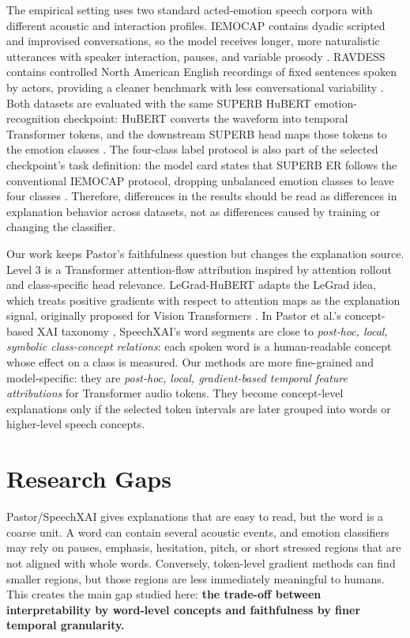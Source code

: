 \documentclass[10pt]{article}
\begin{document}
The empirical setting uses two standard acted-emotion speech corpora with different acoustic and interaction profiles. IEMOCAP contains dyadic scripted and improvised conversations, so the model receives longer, more naturalistic utterances with speaker interaction, pauses, and variable prosody \cite{busso2008iemocap}. RAVDESS contains controlled North American English recordings of fixed sentences spoken by actors, providing a cleaner benchmark with less conversational variability \cite{livingstone2018ravdess}. Both datasets are evaluated with the same SUPERB HuBERT emotion-recognition checkpoint: HuBERT converts the waveform into temporal Transformer tokens, and the downstream SUPERB head maps those tokens to the emotion classes \cite{hsu2021hubert,yang2021superb}. The four-class label protocol is also part of the selected checkpoint's task definition: the model card states that SUPERB ER follows the conventional IEMOCAP protocol, dropping unbalanced emotion classes to leave four classes \cite{hfhubertsuperber}. Therefore, differences in the results should be read as differences in explanation behavior across datasets, not as differences caused by training or changing the classifier.

Our work keeps Pastor's faithfulness question but changes the explanation source. Level 3 is a Transformer attention-flow attribution inspired by attention rollout \cite{abnar2020rollout} and class-specific head relevance. LeGrad-HuBERT adapts the LeGrad idea, which treats positive gradients with respect to attention maps as the explanation signal, originally proposed for Vision Transformers \cite{bousselham2024legrad}. In Pastor et al.'s concept-based XAI taxonomy \cite{poeta2024concept}, SpeechXAI's word segments are close to \emph{post-hoc, local, symbolic class-concept relations}: each spoken word is a human-readable concept whose effect on a class is measured. Our methods are more fine-grained and model-specific: they are \emph{post-hoc, local, gradient-based temporal feature attributions} for Transformer audio tokens. They become concept-level explanations only if the selected token intervals are later grouped into words or higher-level speech concepts.

\section{Research Gaps}

Pastor/SpeechXAI gives explanations that are easy to read, but the word is a coarse unit. A word can contain several acoustic events, and emotion classifiers may rely on pauses, emphasis, hesitation, pitch, or short stressed regions that are not aligned with whole words. Conversely, token-level gradient methods can find smaller regions, but those regions are less immediately meaningful to humans. This creates the main gap studied here: \textbf{the trade-off between interpretability by word-level concepts and faithfulness by finer temporal granularity.}
\end{document}
